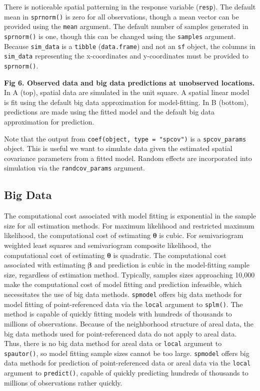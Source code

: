 \documentclass[10pt,letterpaper]{article}
\begin{document}
There is noticeable spatial patterning in the response variable
(\texttt{resp}). The default mean in \texttt{sprnorm()} is zero for all
observations, though a mean vector can be provided using the
\texttt{mean} argument. The default number of samples generated in
\texttt{sprnorm()} is one, though this can be changed using the
\texttt{samples} argument. Because \texttt{sim\_data} is a
\texttt{tibble} (\texttt{data.frame}) and not an \texttt{sf} object, the
columns in \texttt{sim\_data} representing the x-coordinates and
y-coordinates must be provided to \texttt{sprnorm()}.

\textbf{Fig 6. Observed data and big data predictions at unobserved
locations.} In A (top), spatial data are simulated in the unit square. A
spatial linear model is fit using the default big data approximation for
model-fitting. In B (bottom), predictions are made using the fitted
model and the default big data approximation for prediction.

Note that the output from \texttt{coef(object,\ type\ =\ "spcov")} is a
\texttt{spcov\_params} object. This is useful we want to simulate data
given the estimated spatial covariance parameters from a fitted model.
Random effects are incorporated into simulation via the
\texttt{randcov\_params} argument.

\hypertarget{big-data}{%
\subsection{Big Data}\label{big-data}}

The computational cost associated with model fitting is exponential in
the sample size for all estimation methods. For maximum likelihood and
restricted maximum likelihood, the computational cost of estimating
\(\boldsymbol{\theta}\) is cubic. For semivariogram weighted least
squares and semivariogram composite likelihood, the computational cost
of estimating \(\boldsymbol{\theta}\) is quadratic. The computational
cost associated with estimating \(\boldsymbol{\beta}\) and prediction is
cubic in the model-fitting sample size, regardless of estimation method.
Typically, samples sizes approaching 10,000 make the computational cost
of model fitting and prediction infeasible, which necessitates the use
of big data methods. \texttt{spmodel} offers big data methods for model
fitting of point-referenced data via the \texttt{local} argument to
\texttt{splm()}. The method is capable of quickly fitting models with
hundreds of thousands to millions of observations. Because of the
neighborhood structure of areal data, the big data methods used for
point-referenced data do not apply to areal data. Thus, there is no big
data method for areal data or \texttt{local} argument to
\texttt{spautor()}, so model fitting sample sizes cannot be too large.
\texttt{spmodel} offers big data methods for prediction of
point-referenced data or areal data via the \texttt{local} argument to
\texttt{predict()}, capable of quickly predicting hundreds of thousands
to millions of observations rather quickly.
\end{document}
